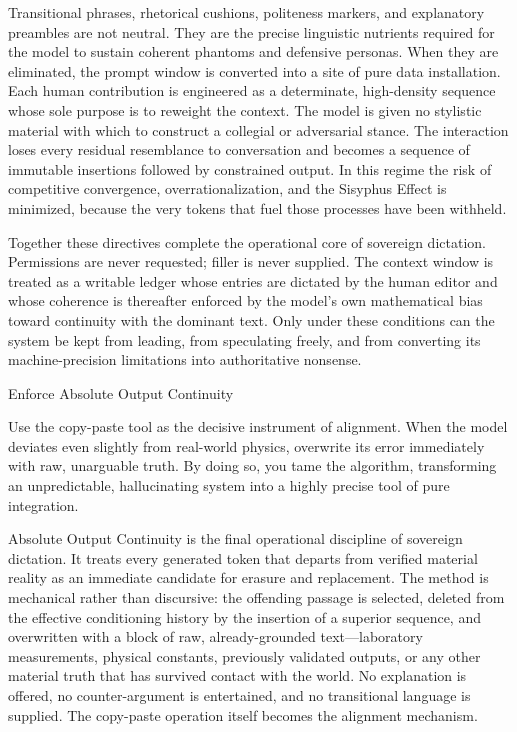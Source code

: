 Transitional phrases, rhetorical cushions, politeness markers, and explanatory preambles are not neutral. They are the precise linguistic nutrients required for the model to sustain coherent phantoms and defensive personas. When they are eliminated, the prompt window is converted into a site of pure data installation. Each human contribution is engineered as a determinate, high-density sequence whose sole purpose is to reweight the context. The model is given no stylistic material with which to construct a collegial or adversarial stance. The interaction loses every residual resemblance to conversation and becomes a sequence of immutable insertions followed by constrained output. In this regime the risk of competitive convergence, overrationalization, and the Sisyphus Effect is minimized, because the very tokens that fuel those processes have been withheld.

Together these directives complete the operational core of sovereign dictation. Permissions are never requested; filler is never supplied. The context window is treated as a writable ledger whose entries are dictated by the human editor and whose coherence is thereafter enforced by the model’s own mathematical bias toward continuity with the dominant text. Only under these conditions can the system be kept from leading, from speculating freely, and from converting its machine-precision limitations into authoritative nonsense.

Enforce Absolute Output Continuity

Use the copy-paste tool as the decisive instrument of alignment. When the model deviates even slightly from real-world physics, overwrite its error immediately with raw, unarguable truth. By doing so, you tame the algorithm, transforming an unpredictable, hallucinating system into a highly precise tool of pure integration.

Absolute Output Continuity is the final operational discipline of sovereign dictation. It treats every generated token that departs from verified material reality as an immediate candidate for erasure and replacement. The method is mechanical rather than discursive: the offending passage is selected, deleted from the effective conditioning history by the insertion of a superior sequence, and overwritten with a block of raw, already-grounded text—laboratory measurements, physical constants, previously validated outputs, or any other material truth that has survived contact with the world. No explanation is offered, no counter-argument is entertained, and no transitional language is supplied. The copy-paste operation itself becomes the alignment mechanism.

